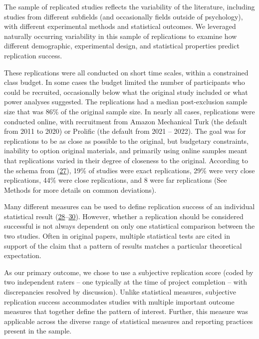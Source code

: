 \documentclass[
  english,
  a4paper,
]{article}
\begin{document}
The sample of replicated studies reflects the variability of the literature, including studies from different subfields (and occasionally fields outside of psychology), with different experimental methods and statistical outcomes. We leveraged naturally occurring variability in this sample of replications to examine how different demographic, experimental design, and statistical properties predict replication success.

These replications were all conducted on short time scales, within a constrained class budget. In some cases the budget limited the number of participants who could be recruited, occasionally below what the original study included or what power analyses suggested. The replications had a median post-exclusion sample size that was 86\% of the original sample size. In nearly all cases, replications were conducted online, with recruitment from Amazon Mechanical Turk (the default from 2011 to 2020) or Prolific (the default from 2021 -- 2022). The goal was for replications to be as close as possible to the original, but budgetary constraints, inability to option original materials, and primarily using online samples meant that replications varied in their degree of closeness to the original. According to the schema from (\protect\hyperlink{ref-lebel2018}{27}), 19\% of studies were exact replications, 29\% were very close replications, 44\% were close replications, and 8 were far replications (See Methods for more details on common deviations).

Many different measures can be used to define replication success of an individual statistical result (\protect\hyperlink{ref-simonsohn2015}{28}--\protect\hyperlink{ref-mathur2020}{30}). However, whether a replication should be considered successful is not always dependent on only one statistical comparison between the two studies. Often in original papers, multiple statistical tests are cited in support of the claim that a pattern of results matches a particular theoretical expectation.

As our primary outcome, we chose to use a subjective replication score (coded by two independent raters -- one typically at the time of project completion -- with discrepancies resolved by discussion). Unlike statistical measures, subjective replication success accommodates studies with multiple important outcome measures that together define the pattern of interest. Further, this measure was applicable across the diverse range of statistical measures and reporting practices present in the sample.
\end{document}
